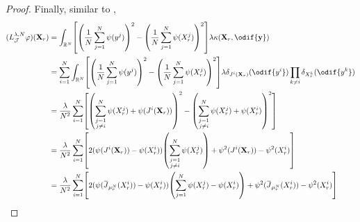 \begin{proof}
  Finally, similar to ,
  \begin{equation}
    \begin{split}
      (L_{\cJ}^{\lambda, N} \varphi) (\bm{X}_r)
       & = \int_{\potspace^N} \sbr*{ \br*{ \frac{1}{N} \sum_{j=1}^N \psi(y^j) }^2 - \br*{ \frac{1}{N} \sum_{j=1}^N \psi(X_r^j) }^2 } \lambda \kappa(\bm{X}_r,\odif{\bm{y}})                                                                   \\
       & = \sum_{i=1}^N \int_{\potspace^N} \sbr*{ \br*{ \frac{1}{N} \sum_{j=1}^N \psi(y^j) }^2 - \br*{ \frac{1}{N} \sum_{j=1}^N \psi(X_r^j) }^2 } \lambda \delta_{\jtarg^i(\bm{X}_r)}(\odif{y^i}) \prod_{k \neq i} \delta_{X_r^k}(\odif{y^k}) \\
       & = \frac{\lambda}{N^2} \sum_{i=1}^N \sbr*{ \br*{  \sum_{\substack{j=1                                                                                                                                                                 \\ j \neq i}}^N \psi(X_r^j) + \psi(\jtarg^i(\bm{X}_r)) }^2 - \br*{ \sum_{\substack{j=1 \\ j \neq i}}^N \psi(X_r^j) + \psi(X_r^i) }^2 }  \\
       & = \frac{\lambda}{N^2} \sum_{i=1}^N \sbr*{ 2 (\psi(\jtarg^i(\bm{X}_r)) - \psi(X_r^i)) \br*{\sum_{\substack{j=1                                                                                                                        \\ j \neq i}}^N \psi(X_r^j)} + \psi^2(\jtarg^i(\bm{X}_r)) - \psi^2(X_r^i) } \\
       & = \frac{\lambda}{N^2} \sum_{i=1}^N \sbr*{ 2 (\psi(\ol{\jtarg}_{\mu_r^N}(X_r^i)) - \psi(X_r^i)) \br*{\sum_{j=1}^N \psi(X_r^j) - \psi(X_r^i)} + \psi^2(\ol{\jtarg}_{\mu_r^N}(X_r^i)) - \psi^2(X_r^i) }                                 \\

\end{split}
\end{equation}
\end{proof}
